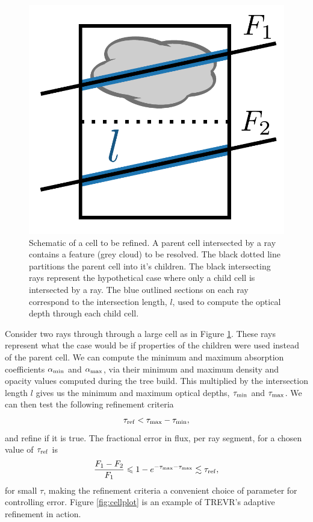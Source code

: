 \documentclass[fleq,usenatbib]{mnras}
\newcommand{\acro}{TREVR}
\newcommand{\tr}{\tau_{\rm ref}}
\begin{document}
\begin{figure}
\includegraphics[width=1\linewidth]{Figures/refine.pdf}
\caption{Schematic of a cell to be refined. A parent cell intersected by a ray 
contains a feature (grey cloud) to be resolved. The black dotted line 
partitions the parent cell into it's children. The black intersecting rays 
represent the hypothetical case where only a child cell is intersected by a 
ray. The blue outlined sections on each ray correspond to the intersection 
length, $l$,  used to compute the optical depth through each child cell.}
\label{fig:refine}
\end{figure}
Consider two rays through through a large cell as in Figure \ref{fig:refine}. 
These rays represent what the case would be if properties of the children were 
used instead of the parent cell. We can compute the minimum and maximum 
absorption coefficients $\alpha_{\rm min}$ and $\alpha_{\rm max}$, via their 
minimum and maximum density and opacity values computed during the tree build. 
This multiplied by the intersection length $l$ gives us the minimum and 
maximum optical depths, $\tau_{\rm min}$ and $\tau_{\rm max}$. We can then 
test the following refinement criteria
\begin{equation}
\label{eqn:refcrit}
\tr < \tau_{\rm max} - \tau_{\rm min},
\end{equation}
and refine if it is true. The fractional error in flux, per ray segment, for a 
chosen value of $\tr$ is
\begin{equation}
\label{eqn:reffrac}
\frac{F_1 - F_2}{F_1} \leq 1 - e^{-\tau_{\rm max}-\tau_{\rm max}} 
\lesssim \tr,
\end{equation}
for small $\tau$, making the refinement criteria a convenient choice of 
parameter for controlling error. Figure \ref{fig:cellplot} is an example of 
\acro{}'s adaptive refinement in action.
\end{document}
